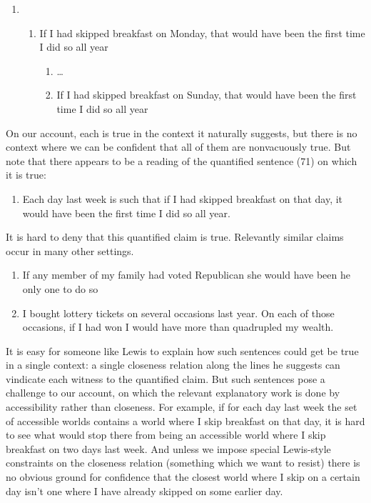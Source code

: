 \begin{enumerate}
\def\labelenumi{(\arabic{enumi})}
\setcounter{enumi}{69}
\item
  \begin{enumerate}
  \def\labelenumii{\alph{enumii}.}
  \itemsep1pt\parskip0pt
  \item
    If I had skipped breakfast on Monday, that would have been the first
    time I did so all year

    \begin{enumerate}
    \def\labelenumiii{\alph{enumiii}.}
    \setcounter{enumiii}{1}
    \itemsep1pt\parskip0pt
    \item
      \ldots{}
    \item
      If I had skipped breakfast on Sunday, that would have been the
      first time I did so all year
    \end{enumerate}
  \end{enumerate}
\end{enumerate}

On our account, each is true in the context it naturally suggests, but
there is no context where we can be confident that all of them are
nonvacuously true. But note that there appears to be a reading of the
quantified sentence (71) on which it is true:

\begin{enumerate}
\def\labelenumi{(\arabic{enumi})}
\setcounter{enumi}{70}
\itemsep1pt\parskip0pt
\item
  Each day last week is such that if I had skipped breakfast on that
  day, it would have been the first time I did so all year.
\end{enumerate}

It is hard to deny that this quantified claim is true. Relevantly
similar claims occur in many other settings.

\begin{enumerate}
\def\labelenumi{(\arabic{enumi})}
\setcounter{enumi}{71}
\item
  If any member of my family had voted Republican she would have been he
  only one to do so
\item
  I bought lottery tickets on several occasions last year. On each of
  those occasions, if I had won I would have more than quadrupled my
  wealth.
\end{enumerate}

It is easy for someone like Lewis to explain how such sentences could
get be true in a single context: a single closeness relation along the
lines he suggests can vindicate each witness to the quantified claim.
But such sentences pose a challenge to our account, on which the
relevant explanatory work is done by accessibility rather than
closeness. For example, if for each day last week the set of accessible
worlds contains a world where I skip breakfast on that day, it is hard
to see what would stop there from being an accessible world where I skip
breakfast on two days last week. And unless we impose special
Lewis-style constraints on the closeness relation (something which we
want to resist) there is no obvious ground for confidence that the
closest world where I skip on a certain day isn't one where I have
already skipped on some earlier day.

